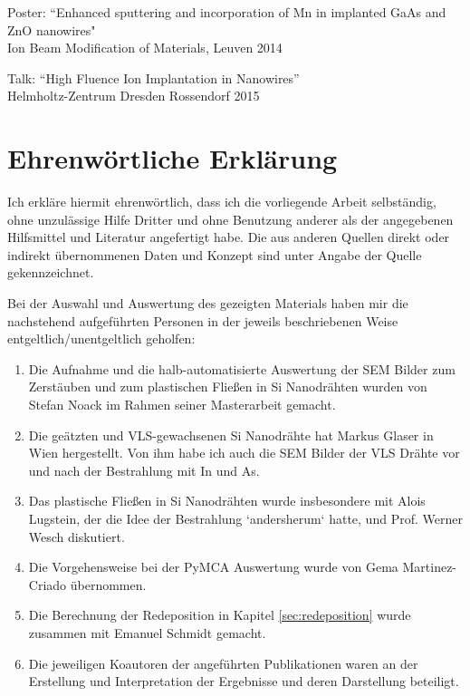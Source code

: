 \begin{appendices}
Poster: ``Enhanced sputtering and incorporation of Mn in implanted GaAs and ZnO nanowires"\\
Ion Beam Modification of Materials, Leuven 2014

Talk: ``High Fluence Ion Implantation in Nanowires''\\
Helmholtz-Zentrum Dresden Rossendorf 2015


\setlength{\parskip}{0em}
\setlength{\parindent}{0.3cm}

\newpage
\thispagestyle{empty}
\mbox{}


\chapter{Ehrenwörtliche Erklärung}

Ich erkläre hiermit ehrenwörtlich, dass ich die vorliegende Arbeit selbständig, ohne unzulässige Hilfe Dritter und ohne Benutzung anderer als der angegebenen Hilfsmittel und Literatur angefertigt habe. Die aus anderen Quellen direkt oder indirekt übernommenen Daten und Konzept sind unter Angabe der Quelle gekennzeichnet.

Bei der Auswahl und Auswertung des gezeigten Materials haben mir die nachstehend aufgeführten Personen in der jeweils beschriebenen Weise entgeltlich/unentgeltlich geholfen:

\begin{enumerate}
\item{Die Aufnahme und die halb-automatisierte Auswertung der SEM Bilder zum Zerstäuben und zum plastischen Fließen in Si Nanodrähten wurden von Stefan Noack im Rahmen seiner Masterarbeit gemacht.}
\item{Die geätzten und VLS-gewachsenen Si Nanodrähte hat Markus Glaser in Wien hergestellt. Von ihm habe ich auch die SEM Bilder der VLS Drähte vor und nach der Bestrahlung mit In und As.}
\item{Das plastische Fließen in Si Nanodrähten wurde insbesondere mit Alois Lugstein, der die Idee der Bestrahlung `andersherum‘ hatte, und Prof. Werner Wesch diskutiert.}
\item{Die Vorgehensweise bei der PyMCA Auswertung wurde von Gema Martinez-Criado übernommen.}
\item{Die Berechnung der Redeposition in Kapitel \ref{sec:redeposition} wurde zusammen mit Emanuel Schmidt gemacht.}
\item{Die jeweiligen Koautoren der angeführten Publikationen waren an der Erstellung und Interpretation der Ergebnisse und deren Darstellung beteiligt.}
\end{enumerate}


\end{appendices}
